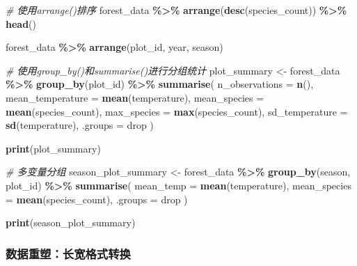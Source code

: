 \documentclass[
]{book}
\newenvironment{Shaded}{\begin{snugshade}}{\end{snugshade}}
\newcommand{\AttributeTok}[1]{\textcolor[rgb]{0.13,0.29,0.53}{#1}}
\newcommand{\CommentTok}[1]{\textcolor[rgb]{0.56,0.35,0.01}{\textit{#1}}}
\newcommand{\FunctionTok}[1]{\textcolor[rgb]{0.13,0.29,0.53}{\textbf{#1}}}
\newcommand{\NormalTok}[1]{#1}
\newcommand{\OtherTok}[1]{\textcolor[rgb]{0.56,0.35,0.01}{#1}}
\newcommand{\SpecialCharTok}[1]{\textcolor[rgb]{0.81,0.36,0.00}{\textbf{#1}}}
\newcommand{\StringTok}[1]{\textcolor[rgb]{0.31,0.60,0.02}{#1}}
\begin{document}
\begin{Shaded}
\begin{Highlighting}[]
\CommentTok{\# 使用arrange()排序}
\NormalTok{forest\_data }\SpecialCharTok{\%\textgreater{}\%}
  \FunctionTok{arrange}\NormalTok{(}\FunctionTok{desc}\NormalTok{(species\_count)) }\SpecialCharTok{\%\textgreater{}\%}
  \FunctionTok{head}\NormalTok{()}

\NormalTok{forest\_data }\SpecialCharTok{\%\textgreater{}\%}
  \FunctionTok{arrange}\NormalTok{(plot\_id, year, season)}

\CommentTok{\# 使用group\_by()和summarise()进行分组统计}
\NormalTok{plot\_summary }\OtherTok{\textless{}{-}}\NormalTok{ forest\_data }\SpecialCharTok{\%\textgreater{}\%}
  \FunctionTok{group\_by}\NormalTok{(plot\_id) }\SpecialCharTok{\%\textgreater{}\%}
  \FunctionTok{summarise}\NormalTok{(}
    \AttributeTok{n\_observations =} \FunctionTok{n}\NormalTok{(),}
    \AttributeTok{mean\_temperature =} \FunctionTok{mean}\NormalTok{(temperature),}
    \AttributeTok{mean\_species =} \FunctionTok{mean}\NormalTok{(species\_count),}
    \AttributeTok{max\_species =} \FunctionTok{max}\NormalTok{(species\_count),}
    \AttributeTok{sd\_temperature =} \FunctionTok{sd}\NormalTok{(temperature),}
    \AttributeTok{.groups =} \StringTok{\textquotesingle{}drop\textquotesingle{}}
\NormalTok{  )}

\FunctionTok{print}\NormalTok{(plot\_summary)}

\CommentTok{\# 多变量分组}
\NormalTok{season\_plot\_summary }\OtherTok{\textless{}{-}}\NormalTok{ forest\_data }\SpecialCharTok{\%\textgreater{}\%}
  \FunctionTok{group\_by}\NormalTok{(season, plot\_id) }\SpecialCharTok{\%\textgreater{}\%}
  \FunctionTok{summarise}\NormalTok{(}
    \AttributeTok{mean\_temp =} \FunctionTok{mean}\NormalTok{(temperature),}
    \AttributeTok{mean\_species =} \FunctionTok{mean}\NormalTok{(species\_count),}
    \AttributeTok{.groups =} \StringTok{\textquotesingle{}drop\textquotesingle{}}
\NormalTok{  )}

\FunctionTok{print}\NormalTok{(season\_plot\_summary)}
\end{Highlighting}
\end{Shaded}

\hypertarget{ux6570ux636eux91cdux5851ux957fux5bbdux683cux5f0fux8f6cux6362}{%
\subsubsection{数据重塑：长宽格式转换}\label{ux6570ux636eux91cdux5851ux957fux5bbdux683cux5f0fux8f6cux6362}}
\end{document}
